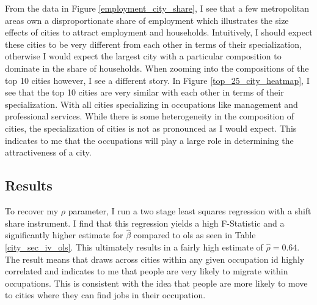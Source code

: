 \documentclass[10pt]{article}
\begin{document}
From the data in Figure \ref{employment_city_share}, I see that a few metropolitan areas own a disproportionate share of employment which illustrates the size effects of cities to attract employment and households. Intuitively, I should expect these cities to be very different from each other in terms of their specialization, otherwise I would expect the largest city with a particular composition to dominate in the share of households. When zooming into the compositions of the top 10 cities however, I see a different story. In Figure \ref{top_25_city_heatmap}, I see that the top 10 cities are very similar with each other in terms of their specialization. With all cities specializing in occupations like management and professional services. While there is some heterogeneity in the composition of cities, the specialization of cities is not as pronounced as I would expect. This indicates to me that the occupations will play a large role in determining the attractiveness of a city.

\subsection{Results}

To recover my $\rho$ parameter, I run a two stage least squares regression with a shift share instrument. I find that this regression yields a high F-Statistic and a significantly higher estimate for $\hat{\beta}$ compared to ols as seen in Table \ref{city_sec_iv_ols}. This ultimately results in a fairly high estimate of $\hat{\rho} = 0.64$. The result means that draws across cities within any given occupation id highly correlated and indicates to me that people are very likely to migrate within occupations. This is consistent with the idea that people are more likely to move to cities where they can find jobs in their occupation.

%         
%         
\end{document}
